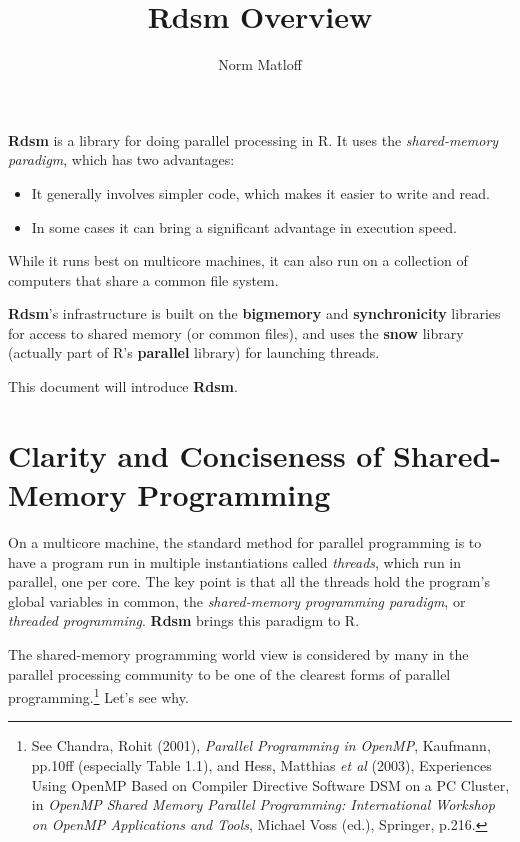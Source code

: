\documentclass[11pt]{article}
\begin{document}
\title{Rdsm Overview} 

\author{Norm Matloff}

\date{}

\maketitle


{\bf Rdsm} is a library for doing parallel processing in R.  It uses the
{\it shared-memory paradigm}, which has two advantages:

\begin{itemize}

\item It generally involves simpler code, which makes it easier to write
and read.

\item In some cases it can bring a significant advantage in execution
speed.

\end{itemize}

While it runs best on multicore machines, it can also run on a
collection of computers that share a common file system.  

{\bf Rdsm}'s infrastructure is built on the {\bf bigmemory} and {\bf
synchronicity} libraries for access to shared memory (or common files),
and uses the {\bf snow} library (actually part of R's {\bf parallel}
library) for launching threads.

This document will introduce {\bf Rdsm}.

\section{Clarity and Conciseness of Shared-Memory Programming}
\label{clarity}

On a multicore machine, the standard method for parallel programming is
to have a program run in multiple instantiations called {\it threads},
which run in parallel, one per core.  The key point is that all the
threads hold the program's global variables in common, the {\it
shared-memory programming paradigm}, or {\it threaded programming}.
{\bf Rdsm} brings this paradigm to R.

The shared-memory programming world view is considered by many in the
parallel processing community to be one of the clearest forms of
parallel programming.\footnote{See Chandra, Rohit (2001), \textit{Parallel 
Programming in OpenMP}, Kaufmann, pp.10ff (especially Table 1.1), and
Hess, Matthias \textit{et al} (2003), Experiences Using OpenMP Based on
Compiler Directive Software DSM on a PC Cluster, in \textit{OpenMP Shared
Memory Parallel Programming: International Workshop on OpenMP
Applications and Tools}, Michael Voss (ed.), Springer, p.216.}
Let's see why.
\end{document}
